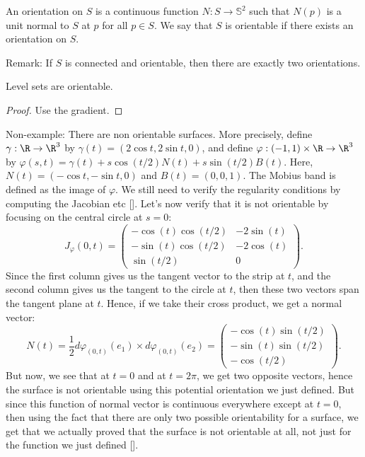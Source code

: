 \begin{definition}
    An orientation on $S$ is a continuous function $N : S \to \mathbb{S}^2$ such that $N(p)$ is a unit normal to $S$ at $p$ for all $p \in S$. We say that $S$ is orientable if there exists an orientation on $S$.
\end{definition}

Remark: If $S$ is connected and orientable, then there are exactly two orientations.

\begin{proposition}
    Level sets are orientable.
\end{proposition}

\begin{proof}
    \td Use the gradient.
\end{proof}

\td

Non-example: There are non orientable surfaces. More precisely, define $\gamma : \R \to \R^3$ by $\gamma(t) = (2\cos t, 2 \sin t, 0)$, and define $\varphi : (-1, 1) \times \R \to \R^3$ by $\varphi(s,t) = \gamma(t) + s\cos(t/2)N(t) + s\sin(t/2)B(t)$. Here, $N(t) = (-\cos t, -\sin t, 0)$ and $B(t) = (0,0,1)$. The Mobius band is defined as the image of $\varphi$. We still need to verify the regularity conditions by computing the Jacobian etc [\td]. Let's now verify that it is not orientable by focusing on the central circle at $s = 0$:
$$J_{\varphi}(0,t) = \begin{pmatrix}
    -\cos(t)\cos(t/2) & -2\sin(t) \\
    -\sin(t)\cos(t/2) & -2\cos(t) \\
    \sin(t/2) & 0
\end{pmatrix}.$$
Since the first column gives us the tangent vector to the strip at $t$, and the second column gives us the tangent to the circle at $t$, then these two vectors span the tangent plane at $t$. Hence, if we take their cross product, we get a normal vector:
$$N(t) = \frac{1}{2}d\varphi_{(0,t)}(e_1) \times d\varphi_{(0,t)}(e_2) = \begin{pmatrix}
    -\cos(t)\sin(t/2) \\
    -\sin(t)\sin(t/2) \\
    -\cos(t/2)
\end{pmatrix}.$$
But now, we see that at $t = 0$ and at $t = 2\pi$, we get two opposite vectors, hence the surface is not orientable using this potential orientation we just defined. But since this function of normal vector is continuous everywhere except at $t = 0$, then using the fact that there are only two possible orientability for a surface, we get that we actually proved that the surface is not orientable at all, not just for the function we just defined [\td].

